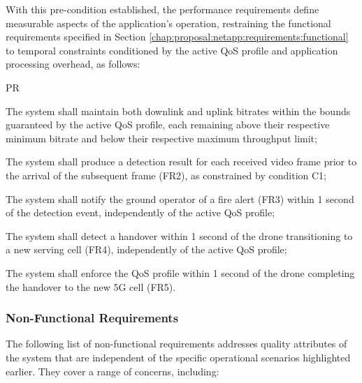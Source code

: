 With this pre-condition established, the performance requirements define measurable aspects of the application's operation, restraining the functional requirements specified in Section \ref{chap:proposal:netapp:requirements:functional} to temporal constraints conditioned by the active \acs{QoS} profile and application processing overhead, as follows:

\begin{custenumerate}{PR}
    \item The system shall maintain both downlink and uplink bitrates within the bounds guaranteed by the active \acs{QoS} profile, each remaining above their respective minimum bitrate and below their respective maximum throughput limit;
    \item The system shall produce a detection result for each received video frame prior to the arrival of the subsequent frame (FR2), as constrained by condition C1;
    \item The system shall notify the ground operator of a fire alert (FR3) within 1 second of the detection event, independently of the active \acs{QoS} profile;
    \item The system shall detect a handover within 1 second of the drone transitioning to a new serving cell (FR4), independently of the active \acs{QoS} profile;
    \item The system shall enforce the \acs{QoS} profile within 1 second of the drone completing the handover to the new \acs{5G} cell (FR5).
\end{custenumerate}

\subsubsection{Non-Functional Requirements}
\label{chap:proposal:netapp:requirements:nonfunctional}

The following list of non-functional requirements addresses quality attributes of the system that are independent of the specific operational scenarios highlighted earlier. They cover a range of concerns, including:

